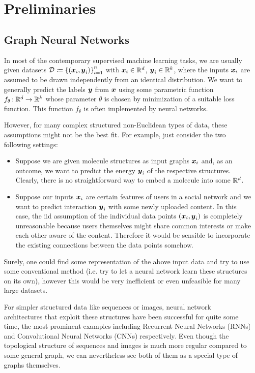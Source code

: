 \section{Preliminaries}
\label{section:preleminaries}

\subsection{Graph Neural Networks}

In most of the contemporary supervised machine learning tasks, we are usually given 
datasets
$\mathcal{D} \coloneqq \left\{(\boldsymbol{x}_i, \boldsymbol{y}_i)\right\}_{i=1}^n$ with $\boldsymbol{x}_i \in \mathbb{R}^{d}$, $\boldsymbol{y}_i \in \mathbb{R}^k$,
where the inputs $\boldsymbol{x}_i$ are assumed to be drawn independently from an identical 
distribution. We want to generally predict the labels $\boldsymbol{y}$ from $\boldsymbol{x}$ using
some parametric function $f_\theta \colon \mathbb{R}^d \to \mathbb{R}^k$ whose parameter $\theta$ is chosen
by minimization of a suitable loss function. This function $f_{\theta}$ is often implemented 
by neural networks.

However, for many complex structured non-Euclidean types of data, these assumptions might 
not be the best fit. For example, just consider the two following settings:
\begin{itemize}
    \item Suppose we are given molecule structures as input graphs $\boldsymbol{x}_i$ and, as an 
          outcome, we want to predict the energy $\boldsymbol{y}_i$ of the respective structures. 
          Clearly, there is no straightforward way to embed a molecule into some $\mathbb{R}^d$.
    \item Suppose our inputs $\boldsymbol{x}_i$ are certain features of users in a social network
          and we want to predict interaction $\boldsymbol{y}_i$ with some newly uploaded content. In this 
          case, the iid assumption of the individual data points $(\boldsymbol{x}_i, \boldsymbol{y}_i)$ is 
          completely unreasonable because users themselves might share common interests 
          or make each other aware of the content. Therefore it would be sensible to incorporate the 
          existing connections between the data points somehow.
\end{itemize}
Surely, one could find some representation of the above input data and try to use some
conventional method (i.e. try to let a neural network learn these structures on its own),
however this would be very inefficient or even unfeasible for many large datasets. 

For simpler structured data like sequences or images, neural
network architectures that exploit these structures have been successful for quite some time, the 
most prominent examples including Recurrent Neural Networks (RNNs) and
Convolutional Neural Networks (CNNs) respectively. 
Even though the topological structure of sequences and images is much more regular
compared to some general graph, we can nevertheless see both of them as a special type of graphs themselves. 

